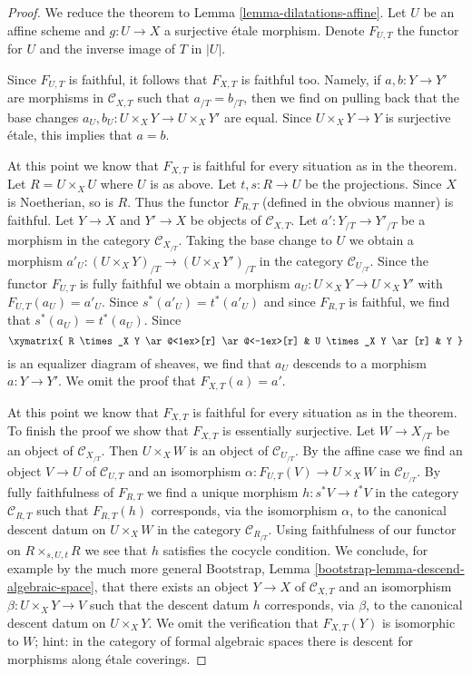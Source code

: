 \begin{proof}
We reduce the theorem to Lemma \ref{lemma-dilatations-affine}.
Let $U$ be an affine scheme and $g : U \to X$ a surjective \'etale morphism.
Denote $F_{U, T}$ the functor for $U$ and the inverse image of $T$ in $|U|$.

\medskip\noindent
Since $F_{U, T}$ is faithful, it follows that $F_{X, T}$
is faithful too. Namely, if $a, b : Y \to Y'$ are morphisms
in $\mathcal{C}_{X, T}$ such that $a_{/T} = b_{/T}$, then we find
on pulling back that the base changes
$a_U, b_U : U \times_X Y \to U \times_X Y'$ are equal.
Since $U \times_X Y \to Y$ is surjective \'etale, this implies that $a = b$.

\medskip\noindent
At this point we know that $F_{X, T}$ is faithful for every situation
as in the theorem. Let $R = U \times_X U$ where $U$ is as above.
Let $t, s : R \to U$ be the projections.
Since $X$ is Noetherian, so is $R$. Thus the functor $F_{R, T}$
(defined in the obvious manner) is
faithful. Let $Y \to X$ and $Y' \to X$ be objects of $\mathcal{C}_{X, T}$.
Let $a' : Y_{/T} \to Y'_{/T}$ be a morphism in the category
$\mathcal{C}_{X_{/T}}$. Taking the base change to $U$ we obtain a
morphism $a'_U : (U \times_X Y)_{/T} \to (U \times_X Y')_{/T}$
in the category $\mathcal{C}_{U_{/T}}$. Since the functor $F_{U, T}$
is fully faithful we obtain a morphism $a_U : U \times_X Y \to U \times_X Y'$
with $F_{U, T}(a_U) = a'_U$. Since $s^*(a'_U) = t^*(a'_U)$ and since
$F_{R, T}$ is faithful, we find that $s^*(a_U) = t^*(a_U)$.
Since
$$
\xymatrix{
R \times_X Y \ar@<1ex>[r] \ar@<-1ex>[r] &
U \times_X Y \ar[r] & Y
}
$$
is an equalizer diagram of sheaves, we find that $a_U$ descends to
a morphism $a : Y \to Y'$. We omit the proof that $F_{X, T}(a) = a'$.

\medskip\noindent
At this point we know that $F_{X, T}$ is faithful for every situation
as in the theorem. To finish the proof we show that $F_{X, T}$ is
essentially surjective. Let $W \to X_{/T}$ be an object of
$\mathcal{C}_{X_{/T}}$. Then $U \times_X W$ is an object of
$\mathcal{C}_{U_{/T}}$. By the affine case we find an object
$V \to U$ of $\mathcal{C}_{U, T}$ and an isomorphism
$\alpha : F_{U, T}(V) \to U \times_X W$ in $\mathcal{C}_{U_{/T}}$.
By fully faithfulness of $F_{R, T}$ we find a unique morphism
$h : s^*V \to t^*V$ in the category $\mathcal{C}_{R, T}$ such that
$F_{R, T}(h)$ corresponds, via the isomorphism $\alpha$, to the
canonical descent datum on $U \times_X W$ in the category
$\mathcal{C}_{R_{/T}}$. Using faithfulness of our functor on
$R \times_{s, U, t} R$ we see that $h$ satisfies the cocycle
condition. We conclude, for example by the much more general
Bootstrap, Lemma \ref{bootstrap-lemma-descend-algebraic-space},
that there exists an object $Y \to X$ of $\mathcal{C}_{X, T}$
and an isomorphism $\beta : U \times_X Y \to V$ such that the
descent datum $h$ corresponds, via $\beta$, to the canonical descent
datum on $U \times_X Y$. We omit the verification that
$F_{X, T}(Y)$ is isomorphic to $W$; hint: in the category of formal
algebraic spaces there is descent for morphisms along \'etale coverings.
\end{proof}











